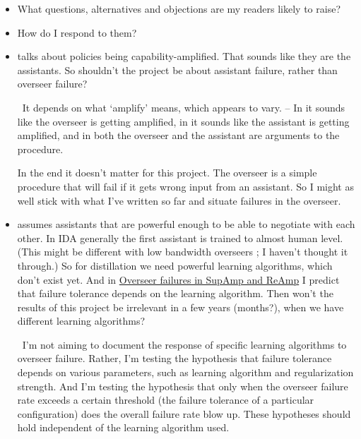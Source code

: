 \documentclass{farlamp}
\begin{document}
\begin{itemize}
\item What questions, alternatives and objections are my readers likely to
    raise?
\item How do I respond to them?
\end{itemize}

\begin{itemize}
    \item \cite{ChriRelAmp} talks about policies being capability-amplified.
        That sounds like they are the assistants. So shouldn't the project be
        about assistant failure, rather than overseer failure?

        \Response\ It depends on what ‘amplify’ means, which appears to vary. –
        In \cite{ChriALBA} it sounds like the overseer is getting amplified, in
        \cite{ChriCapAmp} it sounds like the assistant is getting amplified, and
        in \cite{CotrIDA} both the overseer and the assistant are arguments to
        the  procedure.

        In the end it doesn't matter for this project. The overseer is a simple
        procedure that will fail if it gets wrong input from an assistant. So I
        might as well stick with what I've written so far and situate failures
        in the overseer.

    \item \cite{ChriRelAmp} assumes assistants that are powerful enough to be
        able to negotiate with each other. In IDA generally the first assistant
        is trained to almost human level. (This might be different with low
        bandwidth overseers \parencite{SaunUndIDAClOv}; I haven't thought it
        through.) So for distillation we need powerful learning algorithms,
        which don't exist yet. And in
        \href{https://github.com/farlamp/overfail2.pdf}{Overseer failures in
        SupAmp and ReAmp} I predict that failure tolerance depends on the
        learning algorithm. Then won't the results of this project be irrelevant
        in a few years (months?), when we have different learning algorithms?

        \Response\ I'm not aiming to document the response of specific learning
        algorithms to overseer failure. Rather, I'm testing the hypothesis that
        failure tolerance depends on various parameters, such as learning
        algorithm and regularization strength. And I'm testing the hypothesis
        that only when the overseer failure rate exceeds a certain threshold
        (the failure tolerance of a particular configuration) does the overall
        failure rate blow up. These hypotheses should hold independent of the
        learning algorithm used.
\end{itemize}
\end{document}
